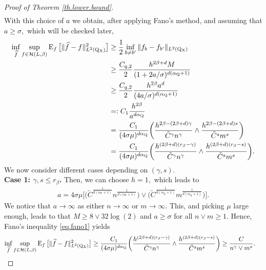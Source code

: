 \documentclass[10pt]{article}
\newcommand{\mH}{\mathcal{H}}
\newcommand{\E}{\operatorname{E}}
\renewcommand{\P}{\operatorname{P}}
\newcommand{\Q}{\operatorname{Q}}
\newcommand{\wh}{\widehat}
\newcommand{\sX}{\mathrm{X}}
\begin{document}
\begin{proof}[Proof of Theorem \ref{th.lower.bound}]
\begin{align}
    \end{align}
    With this choice of $a$ we obtain, after applying Fano's method, and assuming that $a \geq \sigma,$ which will be checked later,
    \begin{align}
        \label{eq.fano1}
        \begin{split}
        \inf_{\wh f} \sup_{f \in \mH(L, \beta)}\E_{f}\big[\|\wh f - f\|_{L^2(\Q\mathstrut_{\!\sX})}^2\big] &\geq \frac 12\inf_{b\neq b'}\|f_b - f_{b'}\|_{L^2(\Q\mathstrut_{\!\sX})}\\
        &\geq \frac{C_{q, 2}}{2}\frac{h^{2\beta + d}M}{(1 + 2a/\sigma)^{d(\alpha_{\Q} + 1)}}\\
        &\geq \frac{C_{q, 2}}{2}\frac{h^{2\beta}a^d}{(4a/\sigma)^{d(\alpha_{\Q} + 1)}}\\
        &=: C_1 \frac{h^{2\beta}}{a^{d\alpha_{\Q}}}\\
        &= \frac{C_1}{(4\sigma\mu)^{d\alpha_{\Q}}}\bigg(\frac{h^{2\beta - (2\beta + d)\gamma}}{\tilde C^{\gamma}n^{\gamma}} \wedge \frac{h^{2\beta - (2\beta + d)s}}{\tilde C^s m^s}\bigg)\\
        &= \frac{C_1}{(4\sigma\mu)^{d\alpha_{\Q}}}\bigg(\frac{h^{(2\beta + d)(r_\beta - \gamma)}}{\tilde C^{\gamma}n^{\gamma}} \wedge \frac{h^{(2\beta + d)(r_\beta - s)}}{\tilde C^s m^s}\bigg).
        \end{split}
    \end{align}
    We now consider different cases depending on $(\gamma, s).$ \\
    \noindent\textbf{Case 1: $\gamma, s \leq r_\beta$.} Then, we can choose $h = 1,$ which leads to
    \begin{align*}
        a = 4\sigma\mu\bigg[\Big(\tilde C^{\tfrac{1}{d(\alpha_{\P} + 1)}}n^{\tfrac{1}{d(\alpha_{\P} + 1)}}\Big)\vee \Big(\tilde C^{\tfrac{1}{d(\alpha_{\Q} + 1)}}m^{\tfrac{1}{d(\alpha_{\Q} + 1)}}\Big)\bigg].
    \end{align*}
    We notice that $a \to \infty$ as either $n\to \infty$ or $m\to \infty.$ This, and picking $\mu$ large enough, leads to that $M \geq 8\vee 32\log(2)$ and $a \geq \sigma$ for all $n \vee m \geq 1.$ Hence, Fano's inequality \eqref{eq.fano1} yields
    \begin{align*}
        \inf_{\wh f} \sup_{f \in \mH(L, \beta)}\E_{f}\big[\|\wh f - f\|_{L^2(\Q\mathstrut_{\!\sX})}^2\big] &\geq \frac{C_1}{(4\sigma\mu)^{d\alpha_{\Q}}}\bigg(\frac{h^{(2\beta + d)(r_\beta - \gamma)}}{\tilde C^{\gamma}n^{\gamma}} \wedge \frac{h^{(2\beta + d)(r_\beta - s)}}{\tilde C^s m^s}\bigg)\geq \frac{C}{n^{\gamma}\vee m^s}.

\end{align*}
\end{proof}
\end{document}
